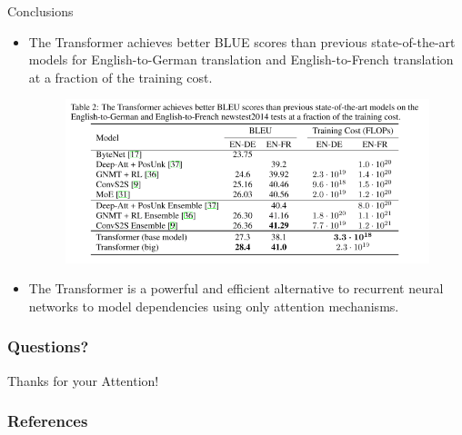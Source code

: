 \documentclass[handout]{beamer}
\begin{document}
\begin{frame}{Conclusions}
\begin{scriptsize}
\begin{itemize}

 \item The Transformer achieves better BLUE scores than previous state-of-the-art models for English-to-German translation and English-to-French translation at a fraction of the training cost.

      \begin{figure}[h]
        	\includegraphics[scale = 0.29]{pics/transformerresults.png}
        \end{figure}  

\item The Transformer is a powerful and efficient alternative to recurrent neural networks to model dependencies using only attention mechanisms.

 
\end{itemize}

\end{scriptsize}


\end{frame}

\begin{frame}
\frametitle{Questions?}
\begin{center}\LARGE Thanks for your Attention!\\ \end{center}



\end{frame}

\begin{frame}[allowframebreaks]\scriptsize
\frametitle{References}


%
\end{frame}  


\end{document}

